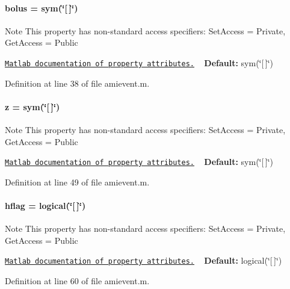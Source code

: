 \paragraph[{bolus}]{\setlength{\rightskip}{0pt plus 5cm}bolus = sym(\char`\"{}\mbox{[}$\,$\mbox{]}\char`\"{})}\label{classamievent_ab9227561ac246ee4b70f9e65c25ffda7}
\begin{DoxyNote}{Note}
This property has non-\/standard access specifiers\+: {\ttfamily Set\+Access = Private, Get\+Access = Public} 

\href{http://www.mathworks.com/help/matlab/matlab_oop/property-attributes.html}{\tt Matlab documentation of property attributes.} ~\newline
{\bfseries Default\+:} sym(\char`\"{}\mbox{[}$\,$\mbox{]}\char`\"{}) 
\end{DoxyNote}


Definition at line 38 of file amievent.\+m.

\hypertarget{classamievent_a25ed1bcb423b0b7200f485fc5ff71c8e}{}
\paragraph[{z}]{\setlength{\rightskip}{0pt plus 5cm}z = sym(\char`\"{}\mbox{[}$\,$\mbox{]}\char`\"{})}\label{classamievent_a25ed1bcb423b0b7200f485fc5ff71c8e}
\begin{DoxyNote}{Note}
This property has non-\/standard access specifiers\+: {\ttfamily Set\+Access = Private, Get\+Access = Public} 

\href{http://www.mathworks.com/help/matlab/matlab_oop/property-attributes.html}{\tt Matlab documentation of property attributes.} ~\newline
{\bfseries Default\+:} sym(\char`\"{}\mbox{[}$\,$\mbox{]}\char`\"{}) 
\end{DoxyNote}


Definition at line 49 of file amievent.\+m.

\hypertarget{classamievent_ab98347b5ce6fbe7bd007030346b88575}{}
\paragraph[{hflag}]{\setlength{\rightskip}{0pt plus 5cm}hflag = logical(\char`\"{}\mbox{[}$\,$\mbox{]}\char`\"{})}\label{classamievent_ab98347b5ce6fbe7bd007030346b88575}
\begin{DoxyNote}{Note}
This property has non-\/standard access specifiers\+: {\ttfamily Set\+Access = Private, Get\+Access = Public} 

\href{http://www.mathworks.com/help/matlab/matlab_oop/property-attributes.html}{\tt Matlab documentation of property attributes.} ~\newline
{\bfseries Default\+:} logical(\char`\"{}\mbox{[}$\,$\mbox{]}\char`\"{}) 
\end{DoxyNote}


Definition at line 60 of file amievent.\+m.

